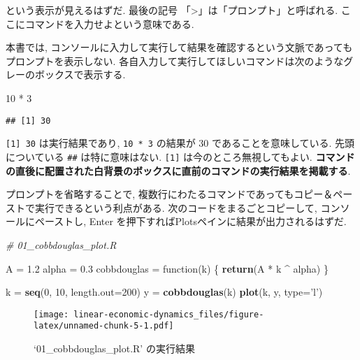 \documentclass[a4paper]{scrbook}
\newenvironment{Shaded}{\begin{snugshade}}{\end{snugshade}}
\newcommand{\KeywordTok}[1]{\textcolor[rgb]{0.13,0.29,0.53}{\textbf{{#1}}}}
\newcommand{\DataTypeTok}[1]{\textcolor[rgb]{0.13,0.29,0.53}{{#1}}}
\newcommand{\DecValTok}[1]{\textcolor[rgb]{0.00,0.00,0.81}{{#1}}}
\newcommand{\FloatTok}[1]{\textcolor[rgb]{0.00,0.00,0.81}{{#1}}}
\newcommand{\StringTok}[1]{\textcolor[rgb]{0.31,0.60,0.02}{{#1}}}
\newcommand{\CommentTok}[1]{\textcolor[rgb]{0.56,0.35,0.01}{\textit{{#1}}}}
\newcommand{\NormalTok}[1]{{#1}}
\theoremstyle{definition}
\begin{document}
という表示が見えるはずだ. 最後の記号
「\textgreater{}」は「プロンプト」と呼ばれる.
ここにコマンドを入力せよという意味である.

本書では,
コンソールに入力して実行して結果を確認するという文脈であってもプロンプトを表示しない.
各自入力して実行してほしいコマンドは次のようなグレーのボックスで表示する.

\begin{Shaded}
\begin{Highlighting}[]
\DecValTok{10} \NormalTok{*}\StringTok{ }\DecValTok{3}
\end{Highlighting}
\end{Shaded}

\begin{verbatim}
## [1] 30
\end{verbatim}

\texttt{{[}1{]}\ 30} は実行結果であり, \texttt{10\ *\ 3} の結果が 30
であることを意味している. 先頭についている \texttt{\#\#}
は特に意味はない. \texttt{{[}1{]}} は今のところ無視してもよい.
\textbf{コマンドの直後に配置された白背景のボックスに直前のコマンドの実行結果を掲載する}.

プロンプトを省略することで,
複数行にわたるコマンドであってもコピー＆ペーストで実行できるという利点がある.
次のコードをまるごとコピーして, コンソールにペーストし, Enter
を押下すればPlotsペインに結果が出力されるはずだ.

\begin{Shaded}
\begin{Highlighting}[]
\CommentTok{# 01_cobbdouglas_plot.R}

\NormalTok{A =}\StringTok{ }\FloatTok{1.2}
\NormalTok{alpha =}\StringTok{ }\FloatTok{0.3}
\NormalTok{cobbdouglas =}\StringTok{ }\NormalTok{function(k) \{}
  \KeywordTok{return}\NormalTok{(A *}\StringTok{ }\NormalTok{k ^}\StringTok{ }\NormalTok{alpha)}
\NormalTok{\}}

\NormalTok{k =}\StringTok{ }\KeywordTok{seq}\NormalTok{(}\DecValTok{0}\NormalTok{, }\DecValTok{10}\NormalTok{, }\DataTypeTok{length.out=}\DecValTok{200}\NormalTok{)}
\NormalTok{y =}\StringTok{ }\KeywordTok{cobbdouglas}\NormalTok{(k)}
\KeywordTok{plot}\NormalTok{(k, y, }\DataTypeTok{type=}\StringTok{'l'}\NormalTok{)}
\end{Highlighting}
\end{Shaded}

\begin{figure}[htbp]
\centering
\texttt{[image: linear-economic-dynamics\_files/figure-latex/unnamed-chunk-5-1.pdf]}
\caption{\label{fig:unnamed-chunk-5}`01\_cobbdouglas\_plot.R' の実行結果}
\end{figure}
\end{document}
